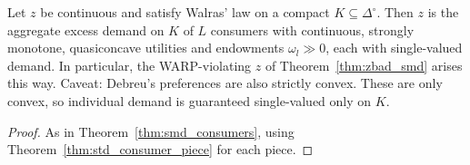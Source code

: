 \begin{theorem}
\label{thm:smd_standard}
\leanok
{}
Let $z$ be continuous and satisfy Walras' law on a compact $K \subseteq \Delta^\circ$. Then $z$ is the aggregate excess demand on $K$
of $L$ consumers with continuous, strongly monotone, quasiconcave utilities and endowments $\omega_l \gg 0$, each with single-valued
demand. In particular, the WARP-violating $z$ of Theorem~\ref{thm:zbad_smd} arises this way. Caveat: Debreu's preferences are also
strictly convex. These are only convex, so individual demand is guaranteed single-valued only on $K$.
\end{theorem}
\begin{proof}
\leanok
As in Theorem~\ref{thm:smd_consumers}, using Theorem~\ref{thm:std_consumer_piece} for each piece.
\end{proof}
